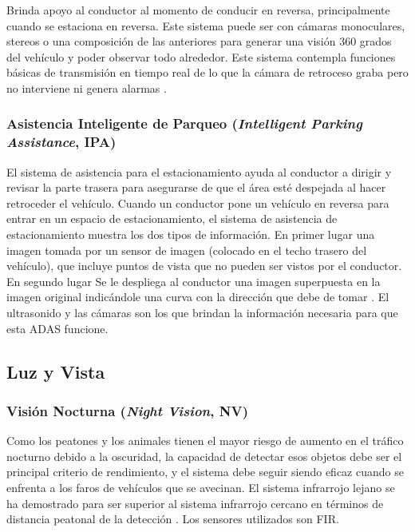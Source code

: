 Brinda apoyo al conductor al momento de conducir en reversa, principalmente cuando se estaciona en reversa. Este sistema puede ser con cámaras monoculares, stereos o una composición de las anteriores para generar una visión 360 grados del vehículo y poder observar todo alrededor. Este sistema contempla funciones básicas de transmisión en tiempo real de lo que la cámara de retroceso graba pero no interviene ni genera alarmas \cite{Park2017}. 

\newpage

\subsubsection{Asistencia Inteligente de Parqueo  {\footnotesize(\textit{Intelligent Parking Assistance}, IPA)}}

El sistema de asistencia para el estacionamiento ayuda al conductor a dirigir y revisar la parte trasera para asegurarse de que el área esté despejada al hacer retroceder el vehículo. 
Cuando un conductor pone un vehículo en reversa para entrar en un espacio de estacionamiento, el sistema de asistencia de estacionamiento muestra los dos tipos de información. En primer lugar una imagen tomada por un sensor de imagen (colocado en el techo trasero del vehículo), que incluye puntos de vista que no pueden ser vistos por el conductor. En segundo lugar Se le despliega al conductor una imagen superpuesta en la imagen original indicándole una curva con la dirección que debe de tomar \cite{Reyher2010}. El ultrasonido y las cámaras son los que brindan la información necesaria para que esta ADAS funcione.


\subsection{Luz y Vista}

\subsubsection{Visión Nocturna {\footnotesize(\textit{Night Vision}, NV)}}

Como los peatones y los animales tienen el mayor riesgo de aumento en el tráfico nocturno debido a la oscuridad, la capacidad de detectar esos objetos debe ser el principal criterio de rendimiento, y el sistema debe seguir siendo eficaz cuando se enfrenta a los faros de vehículos que se avecinan. El sistema infrarrojo lejano se ha demostrado para ser superior al sistema infrarrojo cercano en términos de distancia peatonal de la detección \cite{Reyher2010}. Los sensores utilizados son FIR.

